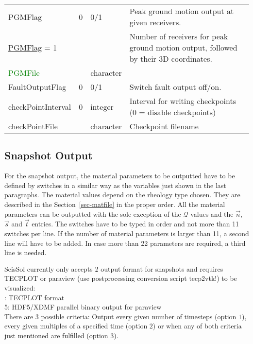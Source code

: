 \documentclass[12pt,twoside]{article}
\def\Q{{\mathcal Q}}
\begin{document}
\begin{table}[H]
\begin{center}
\begin{tabular}{|p{4cm}|p{2.7cm}|p{2cm}|p{4cm}|}
PGMFlag & 0 & 0/1 & Peak ground motion output at given receivers.\\
\hdashline
\uline{PGMFlag} = 1 & & & Number of receivers for peak ground motion output, followed by their 3D coordinates.\\
\textcolor{green}{PGMFile} & & character & \\
\hline
FaultOutputFlag & 0 & 0/1 & Switch fault output off/on.\\
\hline
checkPointInterval & 0 & integer & Interval for writing checkpoints (0 = disable checkpoints) \\
checkPointFile & & character & Checkpoint filename \\
\hline
\end{tabular}
\end{center}
\label{output-table}
\end{table}



\subsection{Snapshot Output}
\label{sec-block-snap}

For the snapshot output, the material parameters to be outputted have to be defined by switches
in a similar way as the variables just shown in the last paragraphs.
The material values depend on the rheology type chosen.
They are described in the Section~\ref{sec-matfile} in the proper order.
All the material parameters can be outputted with the sole exception of the $\Q$ values
and the $\vec n$, $\vec s$ and $\vec t$ entries.
The switches have to be typed in order and not more than 11 switches per line.
If the number of material parameters is larger than 11, a second line will have to be added.
In case more than 22 parameters are required, a third line is needed.

\noindent
SeisSol currently only accepts 2 output format for snapshots
and requires TECPLOT or paraview (use postprocessing conversion script tecp2vtk!) to be visualized:\\

: TECPLOT format\\
5: HDF5/XDMF parallel binary output for paraview\\

\noindent
There are 3 possible criteria: Output every given number of timesteps
(option $1$), every given multiples of a specified time (option $2$)
or when any of both criteria just mentioned are fulfilled (option $3$). \\
\end{document}
